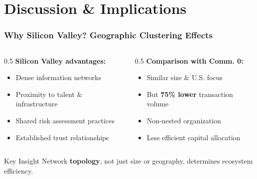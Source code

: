 \section{Discussion \& Implications}

\begin{frame}
\frametitle{Why Silicon Valley? Geographic Clustering Effects}

\begin{columns}
\begin{column}{0.5\textwidth}
\textbf{Silicon Valley advantages:}
\begin{itemize}
    \item Dense information networks
    \item Proximity to talent \& infrastructure
    \item Shared risk assessment practices
    \item Established trust relationships
\end{itemize}
\end{column}

\begin{column}{0.5\textwidth}
\textbf{Comparison with Comm. 0:}
\begin{itemize}
    \item Similar size \& U.S. focus
    \item But \textbf{75\% lower} transaction volume
    \item Non-nested organization
    \item Less efficient capital allocation
\end{itemize}
\end{column}
\end{columns}

\vspace{0.3cm}
\begin{alertblock}{Key Insight}
Network \textbf{topology}, not just size or geography, determines ecosystem efficiency.
\end{alertblock}

\end{frame}

